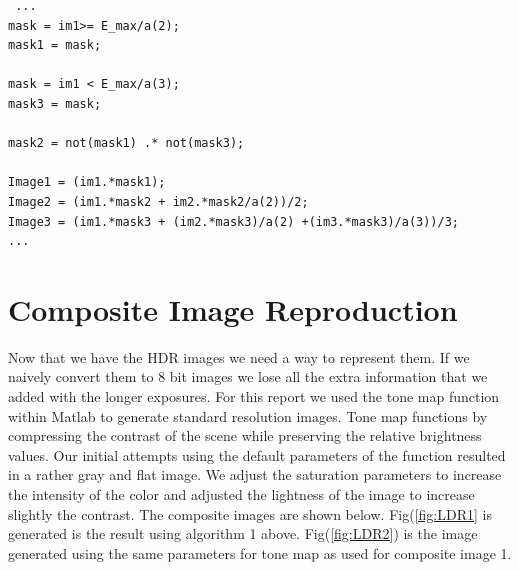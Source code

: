 \documentclass[a4paper]{article}
\begin{document}
 \begin{verbatim}
 ...
mask = im1>= E_max/a(2);
mask1 = mask;

mask = im1 < E_max/a(3);
mask3 = mask;

mask2 = not(mask1) .* not(mask3);

Image1 = (im1.*mask1);
Image2 = (im1.*mask2 + im2.*mask2/a(2))/2;
Image3 = (im1.*mask3 + (im2.*mask3)/a(2) +(im3.*mask3)/a(3))/3;
...
 \end{verbatim}

\section{Composite Image Reproduction}
Now that we have the HDR images we need a way to represent them.  If we naively convert them to 8 bit images we lose all the extra information that we added with the longer exposures.  For this report we used the tone map function within Matlab to generate standard resolution images.  Tone map functions by compressing the contrast of the scene while preserving the relative brightness values. Our initial attempts using the default parameters of the function resulted in a rather gray and flat image.  We adjust the saturation parameters to increase the intensity of the color and adjusted the lightness of the image to increase slightly the contrast.  The composite images are shown below.  Fig(\ref{fig:LDR1} is generated is the result using algorithm 1 above.  Fig(\ref{fig:LDR2}) is the image generated using the same parameters for tone map as used for composite image 1.  
\end{document}
